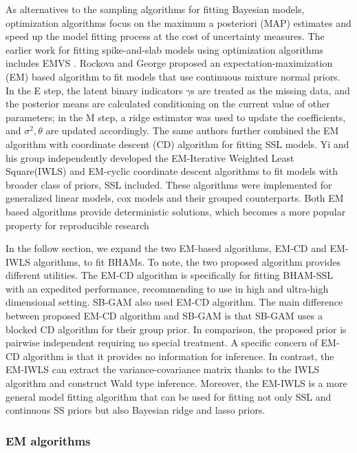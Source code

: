 \documentclass[AMA,STIX1COL,]{WileyNJD-v2}
\begin{document}
As alternatives to the sampling algorithms for fitting Bayesian models,
optimization algorithms focus on the maximum a posteriori (MAP)
estimates and speed up the model fitting process at the cost of
uncertainty measures. The earlier work for fitting spike-and-slab models
using optimization algorithms includes EMVS \citep{Rockova2014a}.
Rockova and George\citep{Rockova2014a} proposed an
expectation-maximization (EM) based algorithm to fit models that use
continuous mixture normal priors. In the E step, the latent binary
indicators \(\gamma\)s are treated as the missing data, and the
posterior means are calculated conditioning on the current value of
other parameters; in the M step, a ridge estimator was used to update
the coefficients, and \(\sigma^2, \theta\) are updated accordingly. The
same authors \citep{Rockova2018b, Rockova2018} further combined the EM
algorithm with coordinate descent (CD) algorithm for fitting SSL models.
Yi and his group independently developed the EM-Iterative Weighted Least
Square(IWLS) and EM-cyclic coordinate descent algorithms to fit models
with broader class of priors, SSL included.\citep{Yi2019} These
algorithms were implemented for generalized linear
models\citep{Tang2017a}, cox models \citep{Tang2017} and their grouped
counterparts\citep{Tang2018, Tang2019}. Both EM based algorithms provide
deterministic solutions, which becomes a more popular property for
reproducible research

In the follow section, we expand the two EM-based algorithms, EM-CD and
EM-IWLS algorithms, to fit BHAMs. To note, the two proposed algorithm
provides different utilities. The EM-CD algorithm is specifically for
fitting BHAM-SSL with an expedited performance, recommending to use in
high and ultra-high dimensional setting. SB-GAM\citep{Bai2020, Bai2021}
also used EM-CD algorithm. The main difference between proposed EM-CD
algorithm and SB-GAM is that SB-GAM uses a blocked CD algorithm for
their group prior. In comparison, the proposed prior is pairwise
independent requiring no special treatment. A specific concern of EM-CD
algorithm is that it provides no information for inference. In contrast,
the EM-IWLS can extract the variance-covariance matrix thanks to the
IWLS algorithm and construct Wald type inference. Moreover, the EM-IWLS
is a more general model fitting algorithm that can be used for fitting
not only SSL and continuous SS priors but also Bayesian ridge and lasso
priors.

\hypertarget{em-algorithms}{%
\subsubsection{EM algorithms}\label{em-algorithms}}
\end{document}
